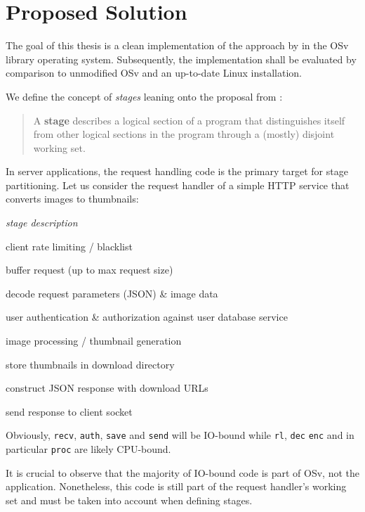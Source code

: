 \documentclass{article}
\begin{document}
\section{Proposed Solution}\label{propsolution}

The goal of this thesis is a clean implementation of the approach by \citeauthor{gottschlag2017} in the OSv library operating system.
Subsequently, the implementation shall be evaluated by comparison to unmodified OSv and an up-to-date Linux installation.

We define the concept of \textit{stages} leaning onto the proposal from \cite{cohort}:
\begin{quote}
A \textbf{stage} describes a logical section of a program that distinguishes itself from other logical sections in the program
through a (mostly) disjoint working set.
\end{quote}

In server applications, the request handling code is the primary target for stage partitioning.
Let us consider the request handler of a simple HTTP service that converts images to thumbnails:
{
\newcommand{\stage}[1]{\texttt{#1}}
\begin{description}[parsep=0pt,labelwidth=1cm,itemindent=1cm]
    \item[\textit{\stage{stage}}] \textit{stage description}
    \item[\stage{limit}] client rate limiting / blacklist
    \item[\stage{recv}] buffer request (up to max request size) 
    \item[\stage{dec}] decode request parameters (JSON) \& image data
    \item[\stage{auth}] user authentication \& authorization against user database service
    \item[\stage{proc}] image processing / thumbnail generation
    \item[\stage{save}] store thumbnails in download directory
    \item[\stage{enc}] construct JSON response with download URLs
    \item[\stage{send}] send response to client socket
\end{description}
Obviously, \stage{recv}, \stage{auth}, \stage{save} and \stage{send} will be IO-bound
while \stage{rl}, \stage{dec} \stage{enc} and in particular \stage{proc} are likely CPU-bound.

It is crucial to observe that the majority of IO-bound code is part of OSv, not the application.
Nonetheless, this code is still part of the request handler's working set and must be taken into account when defining stages.
}
\end{document}
